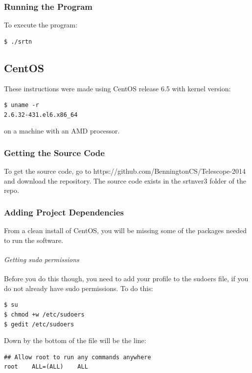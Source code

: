 \documentclass[11pt]{article} %
\begin{document}
\subsubsection{Running the Program}
To execute the program:
\begin{lstlisting}[frame=single]
$ ./srtn
\end{lstlisting}



\subsection{CentOS}


These instructions were made using CentOS release 6.5 with kernel version:

\begin{lstlisting}[frame=single]
$ uname -r
2.6.32-431.el6.x86_64
\end{lstlisting}
on a machine with an AMD processor.


\subsubsection{Getting the Source Code}
To get the source code, go to https://github.com/BenningtonCS/Telescope-2014 and download the repository. The source code exists in the srtnver3 folder of the repo.



\subsubsection{Adding Project Dependencies}
From a clean install of CentOS, you will be missing some of the packages needed to run the software.
\\ \\
\emph{Getting sudo permissions} \\ \\
Before you do this though, you need to add your profile to the sudoers file, if you do not already have sudo permissions. To do this:
\begin{lstlisting}[frame=single]
$ su
$ chmod +w /etc/sudoers
$ gedit /etc/sudoers
\end{lstlisting}

\noindent Down by the bottom of the file will be the line:

\begin{lstlisting}[frame=single]
## Allow root to run any commands anywhere
root    ALL=(ALL)    ALL
\end{lstlisting}
\end{document}
